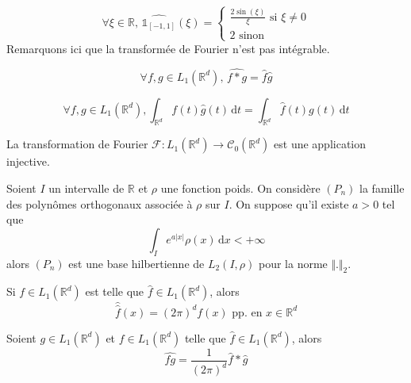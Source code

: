   \begin{example}
    \[
    \forall \xi \in \mathbb{R}, \, \widehat{\mathbb{1}_{[-1,1]}}(\xi) =
    \begin{cases}
      \frac{2 \sin(\xi)}{\xi} \text{ si } \xi \neq 0 \\
      2 \text{ sinon}
    \end{cases}
    \]
    Remarquons ici que la transformée de Fourier n'est pas intégrable.
  \end{example}


  \begin{proposition}
    \[ \forall f, g \in L_1(\mathbb{R}^d), \, \widehat{f * g} = \widehat{f} \widehat{g} \]
  \end{proposition}

  \begin{theorem}
    \[ \forall f, g \in L_1(\mathbb{R}^d), \int_{\mathbb{R}^d} f(t) \widehat{g}(t) \, \mathrm{d}t = \int_{\mathbb{R}^d} \widehat{f}(t) g(t) \, \mathrm{d}t \]
  \end{theorem}

  \begin{corollary}
    La transformation de Fourier $\mathcal{F} : L_1(\mathbb{R}^d) \rightarrow \mathcal{C}_0(\mathbb{R}^d)$ est une application injective.
  \end{corollary}


  \begin{application}
    Soient $I$ un intervalle de $\mathbb{R}$ et $\rho$ une fonction poids. On considère $(P_n)$ la famille des polynômes orthogonaux associée à $\rho$ sur $I$. On suppose qu'il existe $a > 0$ tel que
    \[ \int_I e^{a \vert x \vert} \rho(x) \, \mathrm{d}x < +\infty \]
    alors $(P_n)$ est une base hilbertienne de $L_2(I, \rho)$ pour la norme $\Vert . \Vert_2$.
  \end{application}


  \begin{theorem}
    Si $f \in L_1(\mathbb{R}^d)$ est telle que $\widehat{f} \in L_1(\mathbb{R}^d)$, alors
    \[ \widehat{\widehat{f}}(x) = (2\pi)^d f(x) \text{ pp. en } x \in \mathbb{R}^d \]
  \end{theorem}

  \begin{proposition}
    Soient $g \in L_1(\mathbb{R}^d)$ et $f \in L_1(\mathbb{R}^d)$ telle que $\widehat{f} \in L_1(\mathbb{R}^d)$, alors
    \[ \widehat{fg} = \frac{1}{(2\pi)^d} \widehat{f} * \widehat{g} \]
  \end{proposition}

